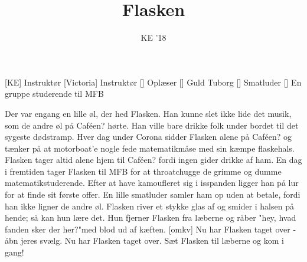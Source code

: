 \documentclass[a4paper,11pt]{article}
\title{Flasken}
\author{KE '18}
\begin{document}
\maketitle

\begin{roles}
[KE] Instruktør
[Victoria] Instruktør
[] Oplæser
[] Guld Tuborg
[] Smatluder
[] En gruppe studerende til MFB
\end{roles}

\begin{song}
 Der var engang en lille øl, der hed Flasken. Han kunne slet ikke lide det musik, som de andre øl på Caféen? hørte.
Han ville bare drikke folk under bordet til det sygeste dødstramp. Hver dag under Corona sidder Flasken alene på Caféen? og tænker på at motorboat’e nogle fede matematikmåse med sin kæmpe flaskehals.
 Flasken tager altid alene hjem til Caféen? fordi ingen gider drikke af ham.
 En dag i fremtiden tager Flasken til MFB for at throatchugge de grimme og dumme matematikstuderende. Efter at have kamoufleret sig i isspanden ligger han på lur for at finde sit første offer. En lille smatluder samler ham op uden at betale, fordi han ikke ligner de andre øl. Flasken river et stykke glas af og smider i halsen på hende; så kan hun lære det. Hun fjerner Flasken fra læberne og råber "hey, hvad fanden sker der her?"med blod ud af kæften.
[omkv] Nu har Flasken taget over - åbn jeres svælg.
 Nu har Flasken taget over.
 Sæt Flasken til læberne og kom i gang!
\end{song}
\end{document}
